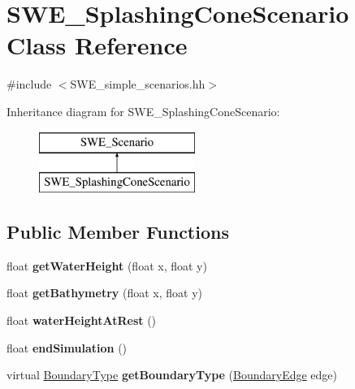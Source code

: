 \hypertarget{classSWE__SplashingConeScenario}{\section{S\-W\-E\-\_\-\-Splashing\-Cone\-Scenario Class Reference}
\label{classSWE__SplashingConeScenario}
}


{\ttfamily \#include $<$S\-W\-E\-\_\-simple\-\_\-scenarios.\-hh$>$}

Inheritance diagram for S\-W\-E\-\_\-\-Splashing\-Cone\-Scenario\-:\begin{figure}[H]
\begin{center}
\leavevmode
\includegraphics[height=2.000000cm]{classSWE__SplashingConeScenario}
\end{center}
\end{figure}
\subsection*{Public Member Functions}
\begin{DoxyCompactItemize}
\item 
\hypertarget{classSWE__SplashingConeScenario_a63d7b91dbd7dce764b12ba76eae856b9}{float {\bfseries get\-Water\-Height} (float x, float y)}\label{classSWE__SplashingConeScenario_a63d7b91dbd7dce764b12ba76eae856b9}

\item 
\hypertarget{classSWE__SplashingConeScenario_a54dff1212b8261e89270f9ab10081cb1}{float {\bfseries get\-Bathymetry} (float x, float y)}\label{classSWE__SplashingConeScenario_a54dff1212b8261e89270f9ab10081cb1}

\item 
\hypertarget{classSWE__SplashingConeScenario_a430b3220b49368a4d20b69d71c087604}{float {\bfseries water\-Height\-At\-Rest} ()}\label{classSWE__SplashingConeScenario_a430b3220b49368a4d20b69d71c087604}

\item 
\hypertarget{classSWE__SplashingConeScenario_a464b296fc1905efc2e86aba909cc5188}{float {\bfseries end\-Simulation} ()}\label{classSWE__SplashingConeScenario_a464b296fc1905efc2e86aba909cc5188}

\item 
\hypertarget{classSWE__SplashingConeScenario_a8b8353a1f1cd58d9f211ccb32e4f3b33}{virtual \hyperlink{SWE__Scenario_8hh_af75d5dd7322fa39ed0af4e7839e600f8}{Boundary\-Type} {\bfseries get\-Boundary\-Type} (\hyperlink{SWE__Scenario_8hh_aa5e01e3f7df312f7b9b0d02521141fcc}{Boundary\-Edge} edge)}\label{classSWE__SplashingConeScenario_a8b8353a1f1cd58d9f211ccb32e4f3b33}

\end{DoxyCompactItemize}
